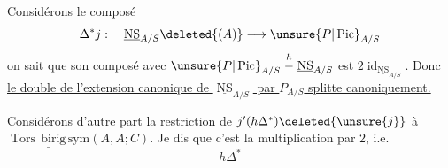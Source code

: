 
Considérons le composé
\[
\Delta^*j:\quad\underline{\operatorname{NS}}_{A/S}\deleted{(A)}\longrightarrow\unsure{P|\operatorname{Pic}}_{A/S}
\]
on sait que son composé avec $\unsure{P|\operatorname{Pic}}_{A/S}\mathrel{\overset{h}{-}}\underline{\operatorname{NS}}_{A/S}$ est $2\operatorname{id}_{\underline{\operatorname{NS}}_{A/S}}$. Donc \uline{le double de l'extension canonique de $\underline{\operatorname{NS}}_{A/S}$ par $P_{A/S}$ splitte canoniquement.}


Considérons d'autre part la restriction de $j'(h\Delta^*)\deleted{\unsure{j}}$ à $\underline{\operatorname{Tors}\,\mathrm{birig}\,\mathrm{sym}}(A,A;C)$.
Je dis que c'est la multiplication par $2$, i.e.
\[
h\Delta^*
\]

